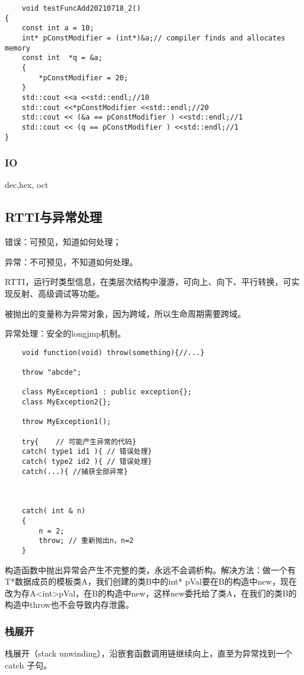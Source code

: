 \documentclass[UTF8]{../computerUniverse}
\begin{document}
\begin{lstlisting}
    void testFuncAdd20210718_2()
{
    const int a = 10;
	int* pConstModifier = (int*)&a;// compiler finds and allocates memory
	const int  *q = &a;
	{
		*pConstModifier = 20;
	}
	std::cout <<a <<std::endl;//10
	std::cout <<*pConstModifier <<std::endl;//20
	std::cout << (&a == pConstModifier ) <<std::endl;//1
	std::cout << (q == pConstModifier ) <<std::endl;//1
}
\end{lstlisting}



\subsubsection{IO}

dec,hex, oct


\subsection{RTTI与异常处理}

错误：可预见，知道如何处理；

异常：不可预见，不知道如何处理。

RTTI，运行时类型信息，在类层次结构中漫游，可向上、向下、平行转换，可实现反射、高级调试等功能。

被抛出的变量称为异常对象，因为跨域，所以生命周期需要跨域。

异常处理：安全的longjmp机制。
\begin{lstlisting}
    void function(void) throw(something){//...}

    throw "abcde";

    class MyException1 : public exception{};
    class MyException2{};

    throw MyException1();

    try{    // 可能产生异常的代码}
    catch( type1 id1 ){ // 错误处理}
    catch( type2 id2 ){ // 错误处理}
    catch(...){ //捕获全部异常}



    catch( int & n)
    {
        n = 2;
        throw; // 重新抛出n，n=2
    }

\end{lstlisting}
构造函数中抛出异常会产生不完整的类，永远不会调析构。解决方法：做一个有T*数据成员的模板类A，我们创建的类B中的int* pVal要在B的构造中new，现在改为存A<int>pVal，在B的构造中new，这样new委托给了类A，在我们的类B的构造中throw也不会导致内存泄露。




\subsubsection{栈展开}
栈展开（stack unwinding），沿嵌套函数调用链继续向上，直至为异常找到一个catch 子句。
\end{document}
